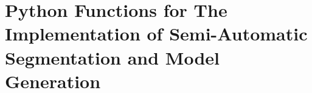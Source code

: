 \section{Python Functions for The Implementation of Semi-Automatic Segmentation and Model Generation}
\label{sec:appendixPythonFunction}

